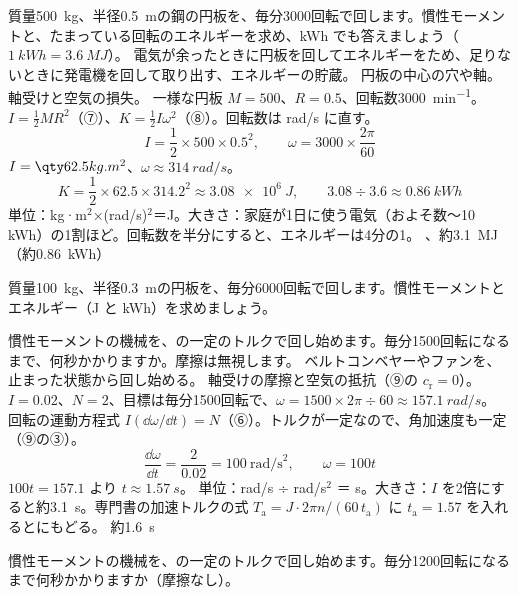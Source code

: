 \begin{phreidai}[はずみ車にためるエネルギー]
\label{ph:力-6:ex4}質量\qty{500}{kg}、半径\qty{0.5}{m}の鋼の円板を、毎分3000回転で回します。慣性モーメントと、たまっている回転のエネルギーを求め、kWh でも答えましょう（$\qty{1}{kWh}=\qty{3.6}{MJ}$）。
\phbamen
電気が余ったときに円板を回してエネルギーをため、足りないときに発電機を回して取り出す、エネルギーの貯蔵。
\phmushi
円板の中心の穴や軸。軸受けと空気の損失。
\phzu
一様な円板 $M=500$、$R=0.5$、回転数\qty{3000}{min^{-1}}。
\phriyu
$I=\tfrac{1}{2}MR^2$（⑦）、$K=\tfrac{1}{2}I\omega^2$（⑧）。回転数は rad/s に直す。
\phtateru
\[ I=\frac{1}{2}\times500\times0.5^2,\qquad\omega=3000\times\frac{2\pi}{60} \]
\phtoku
$I=\pxgI{62.5}$、$\omega\approx\qty{314}{rad/s}$。
\[ K=\frac{1}{2}\times62.5\times314.2^2\approx\qty{3.08e6}{J},\qquad 3.08\div3.6\approx\qty{0.86}{kWh} \]
\phtashikame
単位：kg·m$^2$×(rad/s)$^2$＝J。\quad 大きさ：家庭が1日に使う電気（およそ数〜10 kWh）の1割ほど。\quad 回転数を半分にすると、エネルギーは4分の1。
\kotae {}、約\qty{3.1}{MJ}（約\qty{0.86}{kWh}）
\end{phreidai}
\begin{jibun}
質量\qty{100}{kg}、半径\qty{0.3}{m}の円板を、毎分6000回転で回します。慣性モーメントとエネルギー（J と kWh）を求めましょう。
\end{jibun}

\begin{phreidai}
\label{ph:力-6:ex5}慣性モーメントの機械を、の一定のトルクで回し始めます。毎分1500回転になるまで、何秒かかりますか。摩擦は無視します。
\phbamen
ベルトコンベヤーやファンを、止まった状態から回し始める。
\phmushi
軸受けの摩擦と空気の抵抗（⑨の $c_{\mathrm r}=0$）。
\phzu
$I=0.02$、$N=2$、目標は毎分1500回転で、$\omega=1500\times2\pi\div60\approx\qty{157.1}{rad/s}$。
\phriyu
回転の運動方程式 $I(\dd\omega/\dd t)=N$（⑥）。トルクが一定なので、角加速度も一定（⑨の③）。
\phtateru
\[ \frac{\dd\omega}{\dd t}=\frac{2}{0.02}=100\ \text{rad/s}^2,\qquad\omega=100t \]
\phtoku
$100t=157.1$ より $t\approx\qty{1.57}{s}$。
\phtashikame
単位：rad/s ÷ rad/s$^2$ ＝ s。\quad 大きさ：$I$ を2倍にすると約\qty{3.1}{s}。\quad 専門書の加速トルクの式 $T_{\mathrm a}=J\cdot2\pi n/(60\,t_{\mathrm a})$ に $t_{\mathrm a}=1.57$ を入れるとにもどる。
\kotae 約\qty{1.6}{s}
\end{phreidai}
\begin{jibun}
慣性モーメントの機械を、の一定のトルクで回し始めます。毎分1200回転になるまで何秒かかりますか（摩擦なし）。
\end{jibun}

